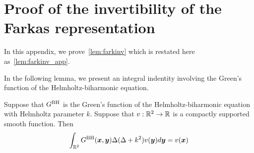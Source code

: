 
\appendix

\section{Proof of the invertibility of the Farkas representation}
In this appendix, we prove~\cref{lem:farkinv} which is restated here
as~\cref{lem:farkinv_app}.

In the following lemma, we present an integral indentity involving the
Green's function of the Helmholtz-biharmonic equation.
\begin{lem}
Suppose that $G^{\textrm{BH}}$ is the Green's function of the Helmholtz-biharmonic equation 
with Helmholtz parameter $k$. Suppose that $v:\mathbb{R}^{2} \to \mathbb{R}$ is a compactly supported smooth
function. Then
\begin{equation}
\int_{\mathbb{R}^{2}} G^{\textrm{BH}}({\boldsymbol x},{\boldsymbol y}) \Delta (\Delta + k^2) v({\boldsymbol y}) d{\boldsymbol y} = v({\boldsymbol x})
\end{equation}
\end{lem}
